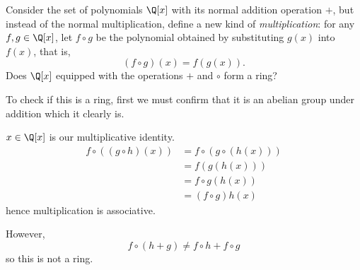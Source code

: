\setcounter{question}{1}
\question Consider the set of polynomials $\Q[x]$ with its normal addition operation $+$, but instead of the normal multiplication, define a new kind of \emph{multiplication}: for any $f, g \in \Q[x]$, let $f \circ g$ be the polynomial obtained by substituting $g(x)$ into $f(x)$, that is,
\[ (f \circ g)(x) = f(g(x)). \]
Does $\Q[x]$ equipped with the operations $+$ and $\circ$ form a ring?
\begin{solution}
    To check if this is a ring, first we must confirm that it is an abelian group under addition which it clearly is.

    $x \in \Q[x]$ is our multiplicative identity.    
    \begin{align*}
        f \circ ( (g \circ h)(x)) &= f \circ (g \circ (h(x))) \\
                                  &= f(g(h(x))) \\
                                  &= f\circ g(h(x)) \\
                                  &= (f \circ g) h(x)
    \end{align*}
    hence multiplication is associative.

    However,
    \[ f \circ(h + g) \neq f \circ h + f \circ g \]
    so this is not a ring.
\end{solution}

